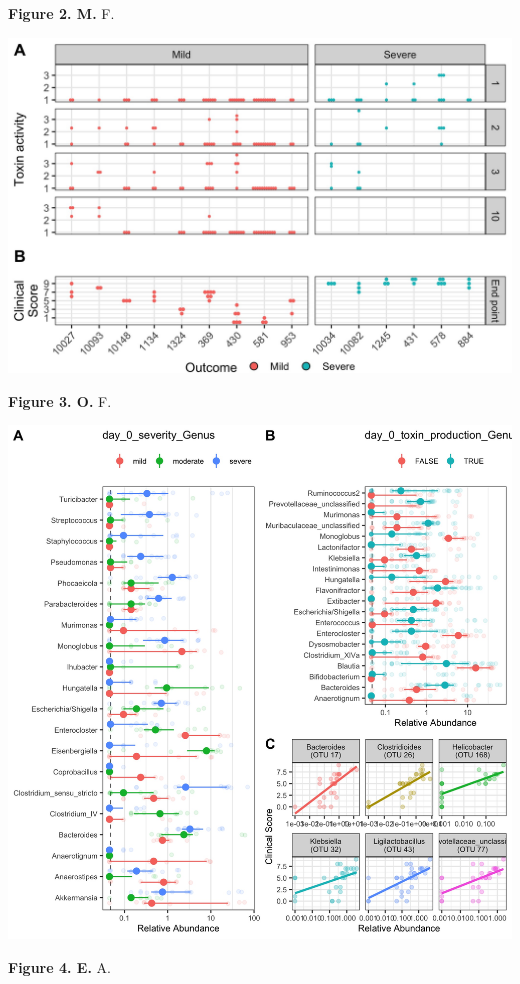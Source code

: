 \documentclass[
  12pt,
]{article}
\begin{document}
\textbf{Figure 2. M.} F.

\hfill\break

\includegraphics{../results/figures/figure_3.jpg}

\textbf{Figure 3. O.} F.

\hfill\break

\includegraphics{../results/figures/figure_4.jpg}

\textbf{Figure 4. E.} A.

\hfill\break
\end{document}
